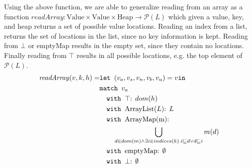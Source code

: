 Using the above function, we are able to generalize reading from an array as a function $\mathit{readArray}: \text{Value} \times \text{Value} \times \text{Heap} \rightarrow \mathcal{P}(L)$ which given a value, key, and heap returns a set of possible value locations. Reading an index from a list, returns the set of locations in the list, since no key information is kept. Reading from $\bot$ or { emptyMap} results in the empty set, since they contain no locations. Finally reading from $\top$ results in all possible locations, e.g. the top element of $\mathcal{P}(L)$.
\begin{align}
\mathit{readArray}(v,k,h) =            &\texttt{let } (v_a,v_s,v_n,v_b,v_u) = v \texttt{in }\notag\\
                            &\texttt{match }v_a\notag\\
                            &\quad\texttt{with }\top\text{: } dom(h) \notag\\
                            &\quad\texttt{with }\text{ArrayList}(L)\text{: } L \notag\\
                            &\quad\texttt{with }\text{ArrayMap(m)}\text{: } \notag\\
                            & \quad\quad \bigcup_{d \in dom(m) \wedge \exists i \in indices(k).i\sqsubseteq d \vee d \sqsubseteq i } m(d)\notag\\
                            &\quad\texttt{with }\text{emptyMap}\text{: } \emptyset \notag\\
                            &\quad\texttt{with }\bot\text{: } \emptyset
\end{align}

